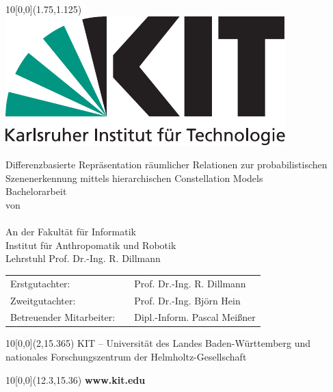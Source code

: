 \newcommand{\diameter}{20}
\newcommand{\xone}{-50}
\newcommand{\xtwo}{450}
\newcommand{\yone}{60}
\newcommand{\ytwo}{-700}

\newcommand{\submissiontime}{DD. MM. 20XX}

\begin{titlepage}

  \begin{textblock}{10}[0,0](1.75,1.125)
    \includegraphics[width=.3\textwidth]{bilder/Kitlogo_de_rgb.pdf}
  \end{textblock}

  \vspace*{3.5cm}
  \begin{center}
    \Huge{Differenzbasierte Repräsentation räumlicher Relationen zur probabilistischen Szenenerkennung mittels hierarchischen Constellation Models}\\
    \vspace*{2cm}
    \Large{Bachelorarbeit\\von}\\
    \vspace*{1cm}
    \huge{\myname}\\
    \vspace*{1cm}
    \Large{An der Fakultät für Informatik\\Institut für Anthropomatik und Robotik\\Lehrstuhl Prof. Dr.-Ing. R. Dillmann}
  \end{center}

  \vspace*{1cm}
  \Large{
    \begin{center}
      \begin{tabular}[ht]{l c l}
        Erstgutachter: & \hfill  & Prof. Dr.-Ing. R. Dillmann\\
        Zweitgutachter: & \hfill  & Prof. Dr.-Ing. Björn Hein\\
        Betreuender Mitarbeiter: & \hfill  & Dipl.-Inform. Pascal Meißner\\
      \end{tabular}
    \end{center}
  }



  \begin{textblock}{10}[0,0](2,15.365)
    \tiny{KIT -- Universität des Landes Baden-Württemberg und nationales Forschungszentrum der Helmholtz-Gesellschaft}
  \end{textblock}

  \begin{textblock}{10}[0,0](12.3,15.36)
    \large{
      \textbf{www.kit.edu}
    }
  \end{textblock}
\end{titlepage}

